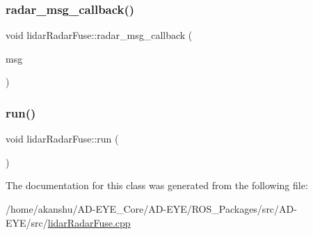 \mbox{\label{classlidarRadarFuse_a8ed38d4819e5c1e453b4b2cf599b9958}} 
\subsubsection{\texorpdfstring{radar\+\_\+msg\+\_\+callback()}{radar\_msg\_callback()}}
{\footnotesize\ttfamily void lidar\+Radar\+Fuse\+::radar\+\_\+msg\+\_\+callback (\begin{DoxyParamCaption}\item[{autoware\+\_\+msgs\+::\+Detected\+Object\+Array}]{msg }\end{DoxyParamCaption})\hspace{0.3cm}{\ttfamily [inline]}}

\mbox{\label{classlidarRadarFuse_a821c1a1718db7014e50bcad3563df87a}} 
\subsubsection{\texorpdfstring{run()}{run()}}
{\footnotesize\ttfamily void lidar\+Radar\+Fuse\+::run (\begin{DoxyParamCaption}{ }\end{DoxyParamCaption})\hspace{0.3cm}{\ttfamily [inline]}}



The documentation for this class was generated from the following file\+:\begin{DoxyCompactItemize}
\item 
/home/akanshu/\+A\+D-\/\+E\+Y\+E\+\_\+\+Core/\+A\+D-\/\+E\+Y\+E/\+R\+O\+S\+\_\+\+Packages/src/\+A\+D-\/\+E\+Y\+E/src/\hyperlink{lidarRadarFuse_8cpp}{lidar\+Radar\+Fuse.\+cpp}\end{DoxyCompactItemize}
